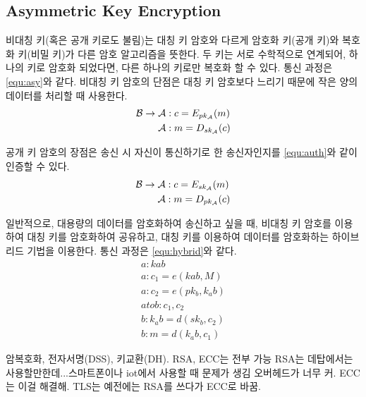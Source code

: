 \subsection*{Asymmetric Key Encryption}

비대칭 키(혹은 공개 키로도 불림)는 대칭 키 암호와 다르게 암호화 키(공개 키)와
복호화 키(비밀 키)가 다른 암호 알고리즘을 뜻한다. 두 키는 서로 수학적으로
연계되어, 하나의 키로 암호화 되었다면, 다른 하나의 키로만 복호화 할 수 있다.
통신 과정은 \ref{equ:asy}와 같다. 비대칭 키 암호의 단점은 대칭 키 암호보다
느리기 때문에 작은 양의 데이터를 처리할 때 사용한다.
\begin{equation}
  \begin{split}
    \mathcal{B} \to \mathcal{A}&: c = E_{pk_{\mathcal{A}}}(m) \\
    \mathcal{A}&: m = D_{sk_{\mathcal{A}}}(c)
  \end{split}
  \label{equ:asy}
\end{equation}

공개 키 암호의 장점은 송신 시 자신이 통신하기로 한 송신자인지를 \ref{equ:auth}와 같이 인증할 수 있다.
\begin{equation}
  \begin{split}
    \mathcal{B} \to \mathcal{A}&: c = E_{sk_{\mathcal{A}}}(m) \\
    \mathcal{A}&: m = D_{pk_{\mathcal{A}}}(c)
  \end{split}
  \label{equ:auth}
\end{equation}

일반적으로, 대용량의 데이터를 암호화하여 송신하고 싶을 때, 비대칭 키 암호를
이용하여 대칭 키를 암호화하여 공유하고, 대칭 키를 이용하여 데이터를 암호화하는
하이브리드 기법을 이용한다. 통신 과정은 \ref{equ:hybrid}와 같다.
\begin{equation}
  \begin{split}
    a : kab \\
    a : c_1 = e(kab, M) \\
    a : c_2 = e(pk_b, k_ab) \\
    a to b : c_1, c_2 \\
    b : k_ab = d(sk_b, c_2) \\
    b : m = d(k_ab, c_1)
  \end{split}
  \label{equ:hybrid}
\end{equation}

암복호화, 전자서명(DSS), 키교환(DH). RSA, ECC는 전부 가능
RSA는 데탑에서는 사용할만한데...스마트폰이나 iot에서 사용할 때 문제가 생김
오버헤드가 너무 커. ECC는 이걸 해결해. TLS는 예전에는 RSA를 쓰다가 ECC로 바꿈.

